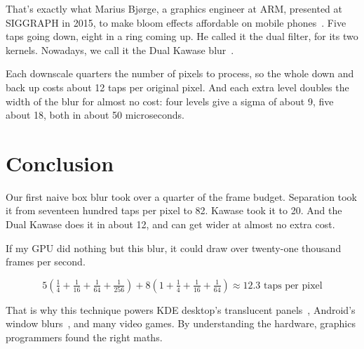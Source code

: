 \documentclass{article}
\begin{document}
That's exactly what Marius Bj{\o}rge, a graphics engineer at ARM, presented at SIGGRAPH in 2015, to make bloom effects affordable on mobile phones~\cite{arm:siggraph2015-bandwidth}. Five taps going down, eight in a ring coming up. He called it the dual filter, for its two kernels. Nowadays, we call it the Dual Kawase blur~\cite{web:frostkiwi-blurs}.

Each downscale quarters the number of pixels to process, so the whole down and back up costs about 12 taps per original pixel. And each extra level doubles the width of the blur for almost no cost: four levels give a sigma of about 9, five about 18, both in about 50 microseconds.


\section{Conclusion}

Our first naive box blur took over a quarter of the frame budget. Separation took it from seventeen hundred taps per pixel to 82. Kawase took it to 20. And the Dual Kawase does it in about 12, and can get wider at almost no extra cost.

If my GPU did nothing but this blur, it could draw over twenty-one thousand frames per second.

\[
    5\left(\tfrac{1}{4} + \tfrac{1}{16} + \tfrac{1}{64} + \tfrac{1}{256}\right)
    + 8\left(1 + \tfrac{1}{4} + \tfrac{1}{16} + \tfrac{1}{64}\right)
    \approx 12.3 \text{ taps per pixel}
\]

That is why this technique powers KDE desktop's translucent panels~\cite{kde:kwin-dual-kawase-commit}, Android's window blurs~\cite{android:renderengine-kawase}, and many video games. By understanding the hardware, graphics programmers found the right maths.
\end{document}
